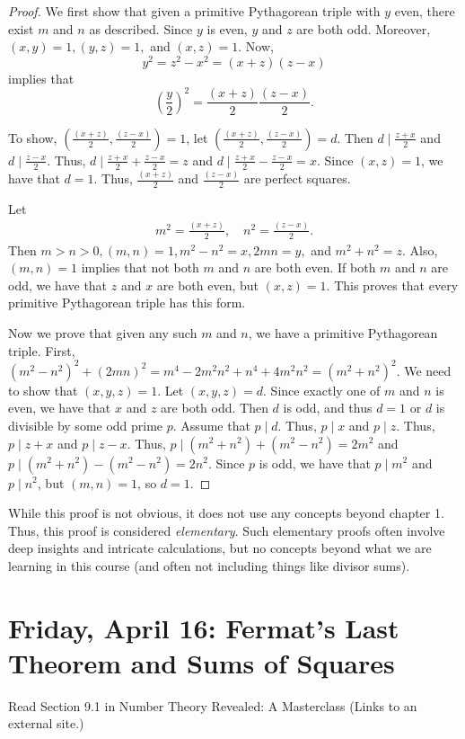 \documentclass[letterpaper, 11 pt]{article}
\begin{document}
\begin{proof}
 We first show that given a primitive Pythagorean triple with $y$ even, there exist $m$ and $n$ as described. Since $y$ is  even, $y$ and $z$ are both odd. Moreover, $(x,y)=1,(y,z)=1,$ and $(x,z)=1$. Now,
 \[y^2=z^2-x^2=(x+z)(z-x)\] implies that \[\left(\frac{y}{2}\right)^2=\frac{(x+z)}{2}\frac{(z-x)}{2}.\] 
 
 To show, $\left(\frac{(x+z)}{2},\frac{(z-x)}{2}\right)=1$, let $\left(\frac{(x+z)}{2},\frac{(z-x)}{2}\right)=d.$ Then $d\mid\frac{z+x}{2}$ and $d\mid\frac{z-x}{2}$. Thus, $d\mid\frac{z+x}{2}+\frac{z-x}{2}=z$ and $d\mid\frac{z+x}{2}-\frac{z-x}{2}=x$. Since $(x,z)=1$, we have that $d=1$. Thus, $\frac{(x+z)}{2}$ and $\frac{(z-x)}{2}$ are perfect squares. 
 
 Let \begin{align*}m^2=\frac{(x+z)}{2},\quad n^2=\frac{(z-x)}{2}.\end{align*}
 Then $m>n>0, (m,n)=1, m^2-n^2=x, 2mn=y,$ and $m^2+n^2=z.$ Also, $(m,n)=1$ implies that not both $m$ and $n$ are both even. If both $m$ and $n$  are odd, we have that $z$ and $x$ are both even, but $(x,z)=1$. This proves that every primitive Pythagorean triple has this form.
 
 Now we prove that given any such $m$ and $n$, we have a primitive Pythagorean triple. First, $(m^2-n^2)^2+
(2mn)^2=m^4-2m^2n^2+n^4+4m^2n^2=(m^2+n^2)^2.$ We need to show that $(x,y,z)=1$. Let $(x,y,z)=d$. Since exactly one of $m$ and $n$ is even, we have that $x$ and $z$ are both odd. Then $d$ is odd, and thus $d=1$ or $d$ is divisible by some odd prime $p$. Assume that $p\mid d$. Thus, $p\mid x$ and $p\mid z$. Thus, $p\mid z+x$ and $p\mid z-x$. Thus, $p\mid (m^2+n^2)+(m^2-n^2)=2m^2$ and $p\mid (m^2+n^2)-(m^2-n^2)=2n^2.$ Since $p$ is odd, we have that $p\mid m^2$ and $p\mid n^2$, but  $(m,n)=1$, so $d=1$.
\end{proof}

While this proof is not obvious, it does not use any concepts beyond chapter 1. Thus, this proof is considered \emph{elementary}. Such elementary proofs often involve deep insights and intricate calculations, but no concepts beyond what we are learning in this course (and often not including things like divisor sums).

\section{Friday, April 16: Fermat's Last Theorem and Sums of Squares}
Read Section 9.1 in Number Theory Revealed: A Masterclass (Links to an external site.) 
\end{document}
